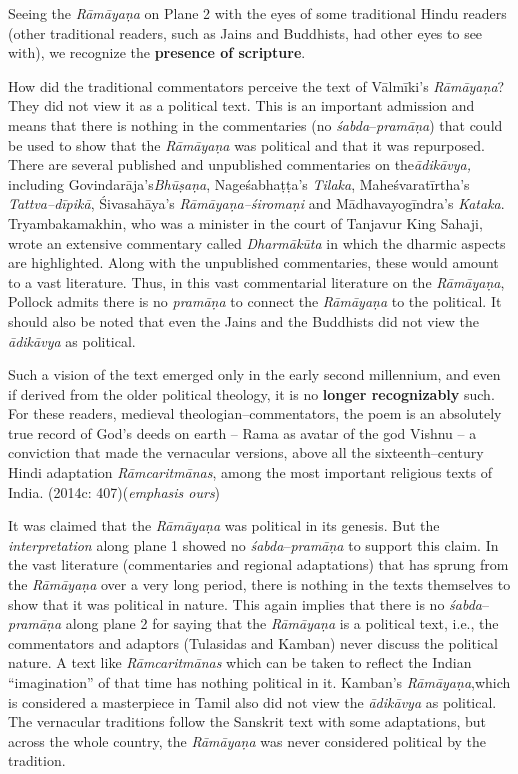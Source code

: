 \begin{myquote}
Seeing the \textit{Rāmāyaṇa} on Plane 2 with the eyes of some traditional Hindu readers (other traditional readers, such as Jains and Buddhists, had other eyes to see with), we recognize the \textbf{presence of scripture}.
\end{myquote}

How did the traditional commentators perceive the text of Vālmīki’s \textit{Rāmāyaṇa}? They did not view it as a political text. This is an important admission and means that there is nothing in the commentaries (no\textit{ śabda}–\textit{pramāṇa}) that could be used to show that the \textit{Rāmāyaṇa }was political and that it was repurposed. There are several published and unpublished commentaries on the\textit{ādikāvya,} including Govindarāja’s\textit{Bhūṣaṇa}, Nageśabhaṭṭa’s \textit{Tilaka}, Maheśvaratīrtha’s \textit{Tattva–dīpikā}, Śivasahāya’s \textit{Rāmāyaṇa–śiromaṇi} and Mādhavayogīndra’s \textit{Kataka}. Tryambakamakhin, who was a minister in the court of Tanjavur King Sahaji, wrote an extensive commentary called \textit{Dharmākūta }in which the dharmic aspects are highlighted. Along with the unpublished commentaries, these would amount to a vast literature. Thus, in this vast commentarial literature on the \textit{Rāmāyaṇa}, Pollock admits there is no \textit{pramāṇa} to connect the \textit{Rāmāyaṇa }to the political. It should also be noted that even the Jains and the Buddhists did not view the\textit{ ādikāvya} as political.

\begin{myquote}
Such a vision of the text emerged only in the early second millennium, and even if derived from the older political theology, it is no \textbf{longer recognizably} such. For these readers, medieval theologian–commentators, the poem is an absolutely true record of God’s deeds on earth – Rama as avatar of the god Vishnu – a conviction that made the vernacular versions, above all the sixteenth–century Hindi adaptation \textit{Rāmcaritmānas}, among the most important religious texts of India. (2014c: 407)(\textit{emphasis ours})
\end{myquote}

It was claimed that the \textit{Rāmāyaṇa }was political in its genesis. But the \textit{interpretation} along plane 1 showed no \textit{śabda}–\textit{pramāṇa }to support this claim. In the vast literature (commentaries and regional adaptations) that has sprung from the \textit{Rāmāyaṇa }over a very long period, there is nothing in the texts themselves to show that it was political in nature. This again implies that there is no \textit{śabda}–\textit{pramāṇa} along plane 2 for saying that the \textit{Rāmāyaṇa }is a political text, i.e., the commentators and adaptors (Tulasidas and Kamban) never discuss the political nature. A text like \textit{Rāmcaritmānas} which can be taken to reflect the Indian “imagination” of that time has nothing political in it. Kamban’s\textit{ Rāmāyaṇa},which is considered a masterpiece in Tamil also did not view the \textit{ādikāvya }as political. The vernacular traditions follow the Sanskrit text with some adaptations, but across the whole country, the \textit{Rāmāyaṇa} was never considered political by the tradition.


